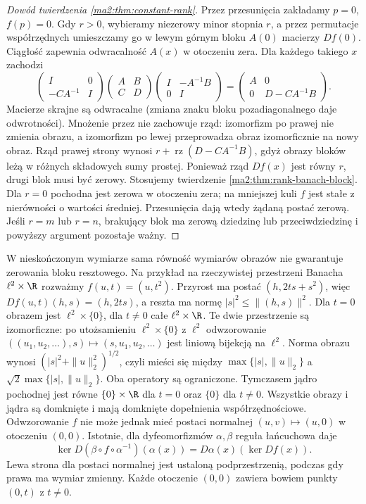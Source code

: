 \begin{proof}[Dowód twierdzenia \ref{ma2:thm:constant-rank}]
Przez przesunięcia zakładamy $p=0$, $f(p)=0$.
Gdy $r>0$, wybieramy niezerowy minor stopnia $r$,
a przez permutacje współrzędnych umieszczamy go
w lewym górnym bloku $A(0)$ macierzy $Df(0)$.
Ciągłość zapewnia odwracalność $A(x)$ w otoczeniu zera.
Dla każdego takiego $x$ zachodzi
\[
 \begin{pmatrix}I&0\\-CA^{-1}&I\end{pmatrix}
 \begin{pmatrix}A&B\\C&D\end{pmatrix}
 \begin{pmatrix}I&-A^{-1}B\\0&I\end{pmatrix}
 =
 \begin{pmatrix}A&0\\0&D-CA^{-1}B\end{pmatrix}.
\]
Macierze skrajne są odwracalne (zmiana znaku
bloku pozadiagonalnego daje odwrotności).
Mnożenie przez nie zachowuje rząd: izomorfizm
po prawej nie zmienia obrazu, a izomorfizm po lewej
przeprowadza obraz izomorficznie na nowy obraz. Rząd prawej
strony wynosi $r+\operatorname{rz}(D-CA^{-1}B)$,
gdyż obrazy bloków leżą w różnych składowych
sumy prostej. Ponieważ rząd $Df(x)$ jest równy $r$,
drugi blok musi być zerowy. Stosujemy twierdzenie
\ref{ma2:thm:rank-banach-block}.
Dla $r=0$ pochodna jest zerowa w otoczeniu zera;
na mniejszej kuli $f$ jest stałe z nierówności
o wartości średniej. Przesunięcia dają wtedy
żądaną postać zerową. Jeśli $r=m$ lub $r=n$,
brakujący blok ma zerową dziedzinę lub przeciwdziedzinę
i powyższy argument pozostaje ważny.
\end{proof}

W nieskończonym wymiarze sama równość wymiarów obrazów
nie gwarantuje zerowania bloku resztowego.
Na przykład na rzeczywistej przestrzeni Banacha
$\ell^2\times\R$ rozważmy $f(u,t)=(u,t^2)$.
Przyrost ma postać $(h,2ts+s^2)$, więc
$Df(u,t)(h,s)=(h,2ts)$, a reszta ma normę
$|s|^2\le\|(h,s)\|^2$. Dla $t=0$ obrazem jest
$\ell^2\times\{0\}$, dla $t\ne0$ całe $\ell^2\times\R$.
Te dwie przestrzenie są izomorficzne: po utożsamieniu
$\ell^2\times\{0\}$ z $\ell^2$ odwzorowanie
$((u_1,u_2,\ldots),s)\mapsto(s,u_1,u_2,\ldots)$
jest liniową bijekcją na $\ell^2$.
Norma obrazu wynosi $(|s|^2+\|u\|_2^2)^{1/2}$,
czyli mieści się między $\max\{|s|,\|u\|_2\}$ a
$\sqrt2\max\{|s|,\|u\|_2\}$. Oba operatory są ograniczone.
Tymczasem jądro pochodnej jest równe
$\{0\}\times\R$ dla $t=0$ oraz $\{0\}$ dla $t\ne0$.
Wszystkie obrazy i jądra są domknięte i mają domknięte
dopełnienia współrzędnościowe. Odwzorowanie $f$ nie może
jednak mieć postaci normalnej $(u,v)\mapsto(u,0)$
w otoczeniu $(0,0)$. Istotnie, dla dyfeomorfizmów
$\alpha,\beta$ reguła łańcuchowa daje
\[
 \ker D(\beta\circ f\circ\alpha^{-1})(\alpha(x))
 =D\alpha(x)(\ker Df(x)).
\]
Lewa strona dla postaci normalnej jest ustaloną
podprzestrzenią, podczas gdy prawa ma wymiar zmienny.
Każde otoczenie $(0,0)$ zawiera bowiem punkty $(0,t)$
z $t\ne0$.

